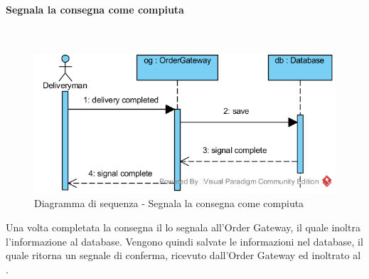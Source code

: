 \begin{samepage}
\paragraph{Segnala la consegna come compiuta}\mbox{}\\
\end{samepage}
\begin{figure}[H]
	\centering
	\includegraphics[width=15cm]{../../documenti/SpecificaTecnica/diagrammi_img/sequenza/fattorino_segnala_consegna_completata.png}
	\caption{Diagramma di sequenza - Segnala la consegna come compiuta}
\end{figure}
Una volta completata la consegna il \Deliveryman{} lo segnala all'Order Gateway, il quale inoltra l'informazione al database. Vengono quindi salvate le informazioni nel database, il quale ritorna un segnale di conferma, ricevuto dall'Order Gateway ed inoltrato al \Deliveryman{}.

